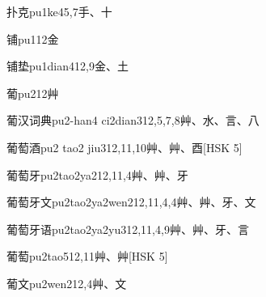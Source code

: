 \begin{entry}{扑克}{pu1ke4}{5,7}{⼿、⼗}
\end{entry}

\begin{entry}{铺}{pu1}{12}{⾦}
\end{entry}

\begin{entry}{铺垫}{pu1dian4}{12,9}{⾦、⼟}
\end{entry}

\begin{entry}{葡}{pu2}{12}{⾋}
\end{entry}

\begin{entry}{葡汉词典}{pu2-han4 ci2dian3}{12,5,7,8}{⾋、⽔、⾔、⼋}
\end{entry}

\begin{entry}{葡萄酒}{pu2 tao2 jiu3}{12,11,10}{⾋、⾋、⾣}[HSK 5]
\end{entry}

\begin{entry}{葡萄牙}{pu2tao2ya2}{12,11,4}{⾋、⾋、⽛}
\end{entry}

\begin{entry}{葡萄牙文}{pu2tao2ya2wen2}{12,11,4,4}{⾋、⾋、⽛、⽂}
\end{entry}

\begin{entry}{葡萄牙语}{pu2tao2ya2yu3}{12,11,4,9}{⾋、⾋、⽛、⾔}
\end{entry}

\begin{entry}{葡萄}{pu2tao5}{12,11}{⾋、⾋}[HSK 5]
\end{entry}

\begin{entry}{葡文}{pu2wen2}{12,4}{⾋、⽂}
\end{entry}

